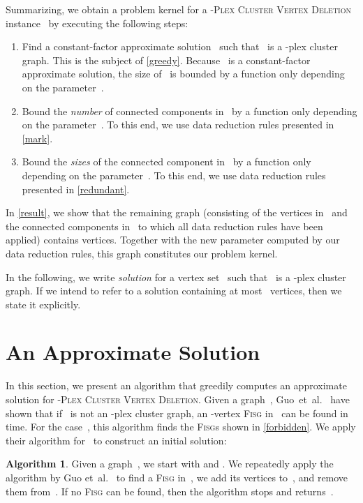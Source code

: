 \documentclass[12pt, a4paper, abstracton]{scrreprt}
\renewcommand{\cite}{~\citep}
\newcommand{\name}{\textsc}
\newcommand{\pvd}[1]{\name{\mbox{-Plex} Cluster Vertex Deletion}}
\newcommand{\pl}[1]{\mbox{-plex}}
\newcommand{\pcg}[1]{\pl #1 cluster graph}
\newcommand{\FISG}{\textsc{Fisg}}
\newcounter{theorem}
\theoremstyle{definition}
\newtheorem{proc}{Algorithm}[chapter]
\theoremstyle{remark}
\begin{document}
Summarizing, we obtain a problem kernel for a \pvd 2 instance~ by executing the following steps:
\begin{enumerate}
\item Find a constant-factor approximate solution~ such that~ is a \pcg 2. This is the subject of \autoref{greedy}. Because~ is a constant-factor approximate solution, the size of~ is bounded by a function only depending on the parameter~. 
\item Bound the \emph{number} of connected components in~ by a function only depending on the parameter~. To this end, we use data reduction rules presented in \autoref{mark}.
\item Bound the \emph{sizes} of the connected component in~ by a function only depending on the parameter~. To this end, we use data reduction rules presented in \autoref{redundant}.
\end{enumerate}
In \autoref{result}, we show that the remaining graph (consisting of the vertices in~ and the connected components in~ to which all data reduction rules have been applied) contains  vertices. Together with the new parameter computed by our data reduction rules, this graph constitutes our problem kernel.

In the following, we write \emph{solution} for a vertex set~ such that~ is a \pcg 2. If we intend to refer to a solution containing at most~ vertices, then we state it explicitly.

\section{An Approximate Solution}
\label{greedy}
In this section, we present an algorithm that greedily computes an approximate solution for \pvd 2. Given a graph~, Guo~et~al.\cite{DBLP:conf/aaim/GuoKNU09} have shown that if~ is not an \pcg s, an -vertex \FISG{} in~ can be found in  time. For the case~, this algorithm finds the \FISG{}s shown in \autoref{forbidden}. We apply their algorithm for~ to construct an initial solution:

\begin{proc}\label{find-X}
  Given a graph~, we start with  and . We repeatedly apply the algorithm by Guo et~al.\cite{DBLP:conf/aaim/GuoKNU09} to find a \FISG{} in~, we add its vertices to~, and remove them from~. If no \FISG{} can be found, then the algorithm stops and returns~.
\end{proc}
\end{document}
